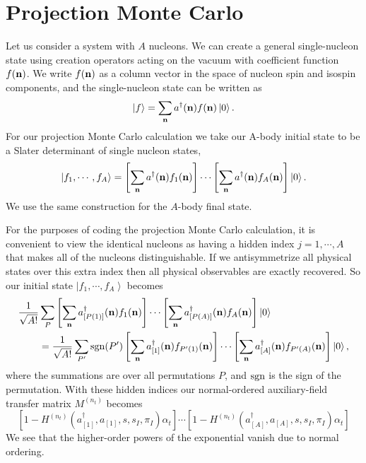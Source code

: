 \section{Projection Monte Carlo}
Let us consider a system with $A$ nucleons.  We can create a general single-nucleon
state using 
creation operators acting on the vacuum with coefficient function $f({\bf
n})$. We write $f({\bf n})$ as a column vector in the space of nucleon spin and isospin components, and the single-nucleon
state can be written as\begin{equation}
\left| f \right> = \sum_{\bf n}a^{\dagger}({\bf n})f({\bf n}) \left| 0 \right>.
\end{equation}
For our projection Monte Carlo calculation we take our A-body initial
state
to be a Slater determinant of single nucleon states,
\begin{equation}
\left| f_1,\cdots ,f_A \right> =   \left[\sum_{\bf n}a^{\dagger}({\bf n})f_1({\bf
n}) \right] \cdots \left[\sum_{\bf n}a^{\dagger}({\bf n})f_A({\bf n}) \right]
\left| 0 \right>.
\end{equation} We use the same construction for the $A$-body final state.

For the purposes of coding the projection Monte Carlo calculation, it is
convenient to view the identical nucleons as having a hidden index $j=1,\cdots
,A$ that makes all of the nucleons distinguishable.  If we antisymmetrize
all physical states over this extra index then all physical observables are
exactly recovered.   So our initial state $\left| f_1,\cdots ,f_A \right>$
becomes
\begin{align}
 \frac{1}{\sqrt{A!}} & \sum_{P}   \left[\sum_{\bf n}a^{\dagger}_{[P(1)]}({\bf n})f_1({\bf
n}) \right] \cdots \left[\sum_{\bf n}a^{\dagger}_{[P(A)]}({\bf n})f_A({\bf
n}) \right]
\left| 0 \right> \nonumber \\
 & =\frac{1}{\sqrt{A!}} \sum_{P'} {\rm sgn}(P') \left[\sum_{\bf n}a^{\dagger}_{[1]}({\bf
n})f_{P'(1)}({\bf
n}) \right] \cdots \left[\sum_{\bf n}a^{\dagger}_{[A]}({\bf n})f_{P'(A)}({\bf
n}) \right]
\left| 0 \right>,
\end{align}
where the summations are over all permutations $P$, and ${\rm sgn}$ is
the sign of the permutation.
With these hidden indices our normal-ordered auxiliary-field transfer matrix
$M^{(n_t)}$  becomes 
\begin{equation}
\left[1-H^{(n_t)}(a_{[1]}^{\dagger},a_{[1]},s,s_I,\pi_I)\alpha_{t}\right]
\cdots \left[1-H^{(n_t)}(a^{\dagger}_{[A]},a_{[A]},s,s_I,\pi_I)\alpha_{t}\right]
\end{equation}
We see that the higher-order powers of the exponential vanish due to normal ordering.

